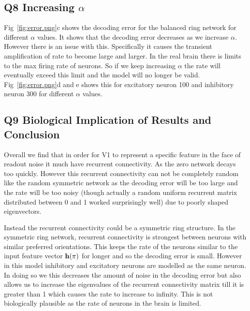 \documentclass[a4paper, 11pt, oneside]{report}
\begin{document}
\subsection*{Q8 Increasing $\alpha$}

Fig~\ref{fig:error.png}c shows the decoding error for the balanced ring network for different $\alpha$ values.
It shows that the decoding error decreases as we increase $\alpha$.
However there is an issue with this. Specifically it causes the transient
amplification of rate to become large and larger. In the real brain
there is limits to the max firing rate of neurons. So if we keep increasing $\alpha$ the rate will eventually exceed this limit
and the model will no longer be valid. Fig~\ref{fig:error.png}d and e shows this for excitatory neuron 100 and inhibitory neuron 300 for different $\alpha$ values.

\subsection*{Q9 Biological Implication of Results and Conclusion}

Overall we find that in order for V1 to represent a specific feature in the face of readout 
noise it much have recurrent connectivity. As the zero network decays too quickly.
However this recurrent connectivity can not be completely random like the random symmetric network
as the decoding error will be too large and the rate will be too noisy (though actually
a random uniform recurrent matrix distributed between 0 and 1 worked surprisingly well) due 
to poorly shaped eigenvectors.

Instead the recurrent connectivity could be a symmetric ring structure.
In the symmetric ring network, recurrent connectivity is strongest between neurons with 
similar preferred orientations.
This keeps the rate of the neurons similar to the input feature vector $\mathbf{h}(\pi)$ for longer and so the decoding error is small.
However in this model inhibitory and excitatory neurons are modelled as the same neuron.
In doing so we this decreases the amount of noise in the decoding error but also allows us 
to increase the eigenvalues of the recurrent connectivity matrix till it is greater than 1
which causes the rate to increase to infinity. This is not biologically plausible as the rate of neurons in the brain is limited.
\end{document}
